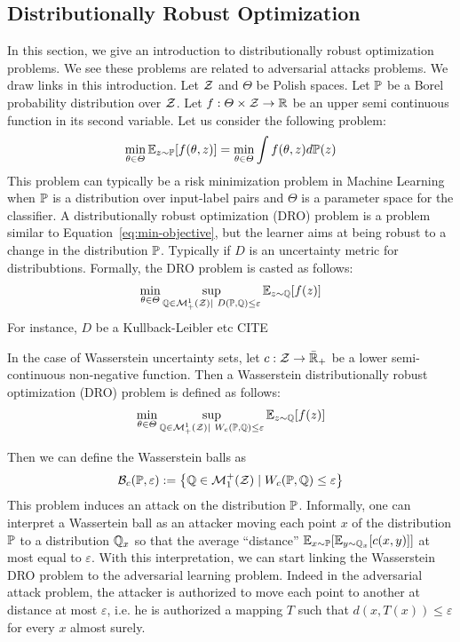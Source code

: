 \subsection{Distributionally Robust Optimization}

In this section, we give an introduction to distributionally robust optimization problems. We see these problems are related to adversarial attacks problems. We draw links in this introduction.  Let $\mathcal{Z}$ and $\Theta$ be Polish spaces. Let $\mathbb{P}$ be a Borel probability distribution over $\mathcal{Z}$. Let $f:\Theta\times\mathcal{Z}\to\mathbb{R}$ be an upper semi continuous function in its second variable. Let us consider the following problem:
\begin{align}
    \label{eq:min-objective}
    \min_{\theta\in\Theta} \mathbb{E}_{z\sim\PP}\left[f(\theta,z)\right] = \min_{\theta\in\Theta} \int f(\theta,z)d\PP(z)
\end{align}
This problem can typically be a risk minimization problem in Machine Learning when $\mathbb{P}$ is a distribution over input-label pairs and $\Theta$ is a parameter space for the classifier. A distributionally robust optimization (DRO) problem is a problem similar to Equation~\eqref{eq:min-objective}, but the learner aims at being robust to a change in the distribution $\mathbb{P}$. Typically if $D$ is an uncertainty metric for distribubtions. Formally, the DRO problem is casted as follows:
\begin{align*}
    \min_{\theta\in\Theta}\sup_{\QQ\in\mathcal{M}^1_+(\ZZ)\mid~D(\PP,\QQ)\leq \varepsilon}\mathbb{E}_{z\sim\QQ}\left[f(z)\right]
\end{align*}
For instance, $D$ be a Kullback-Leibler etc CITE

In the case of Wasserstein uncertainty sets, let $c:\mathcal{Z}\to\bar{\mathbb{R}}_+$ be a lower semi-continuous non-negative function. Then a  Wasserstein distributionally robust optimization (DRO) problem is defined as follows:
\begin{align*}
    \min_{\theta\in\Theta}\sup_{\QQ\in\mathcal{M}^1_+(\ZZ)\mid~W_c(\PP,\QQ)\leq \varepsilon}\mathbb{E}_{z\sim\QQ}\left[f(z)\right]
\end{align*}

Then we can define the Wasserstein balls as 
\begin{align*}
    \mathcal{B}_{c}(\PP,\varepsilon) := \left\{\QQ\in \mathcal{M}^+_1(\mathcal{Z})\mid W_c(\PP,\QQ)\leq \varepsilon\right\}
\end{align*}
This problem induces an attack on the distribution $\mathbb{P}$. Informally, one can interpret a Wassertein ball as an attacker moving each point $x$ of the distribution $\mathbb{P}$ to a distribution $\mathbb{Q}_x$ so that the average ``distance'' $\mathbb{E}_{x\sim\PP}\left[\mathbb{E}_{y\sim\QQ_x}\left[c(x,y)\right]\right]$ at most equal to $\varepsilon$. With this interpretation, we can start linking the Wasserstein DRO problem to the adversarial learning problem. Indeed in the adversarial attack problem, the attacker is authorized to move each point to another at distance at most $\varepsilon$, i.e. he is authorized a mapping $T$ such that $d(x,T(x))\leq \varepsilon$ for every $x$ almost surely. 
